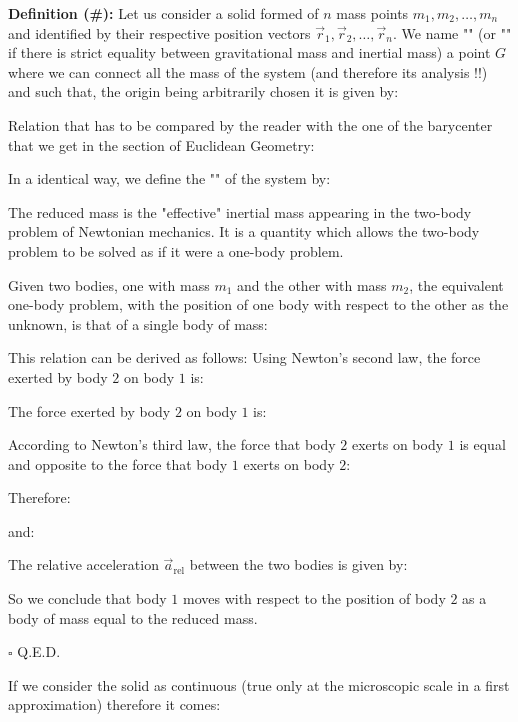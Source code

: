 	\textbf{Definition (\#\mydef):} Let us consider a solid formed of $n$ mass points $m_1,m_2,\ldots,m_n$ and identified by their respective position vectors $\vec{r}_1,\vec{r}_2,\ldots, \vec{r}_n$. We name "" (or "" if there is strict equality between gravitational mass and inertial mass) a point $G$ where we can connect all the mass of the system (and therefore its analysis !!) and such that, the origin being arbitrarily chosen it is given by:
	
	Relation that has to be compared by the reader with the one of the barycenter that we get in the section of Euclidean Geometry:
	
	In a identical way, we define the "" of the system by:
	
	The reduced mass is the "effective" inertial mass appearing in the two-body problem of Newtonian mechanics. It is a quantity which allows the two-body problem to be solved as if it were a one-body problem.
	
	\begin{theorem}
	Given two bodies, one with mass $m_1$ and the other with mass $m_2$, the equivalent one-body problem, with the position of one body with respect to the other as the unknown, is that of a single body of mass:
	
	\end{theorem}
	\begin{dem}
	This relation can be derived as follows:
	Using Newton's second law, the force exerted by body $2$ on body $1$ is:
	
	The force exerted by body $2$ on body $1$ is:
	
	According to Newton's third law, the force that body $2$ exerts on body $1$ is equal and opposite to the force that body $1$ exerts on body $2$:
	
	Therefore:
	
	and:
	
	The relative acceleration $\vec{a}_\text{rel}$ between the two bodies is given by:
	
	So we conclude that body $1$ moves with respect to the position of body $2$ as a body of mass equal to the reduced mass.
	\begin{flushright}
		$\square$  Q.E.D.
	\end{flushright}
	\end{dem}
	 
	If we consider the solid as continuous (true only at the microscopic scale in a first approximation) therefore it comes:
	
